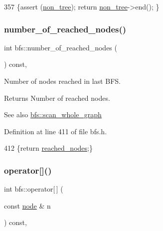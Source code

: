 \begin{DoxyCode}
357     \{assert (\mbox{\hyperlink{classbfs_a056b2131db11e62eb8f41c8dcc117d2e}{non\_tree}}); \textcolor{keywordflow}{return} \mbox{\hyperlink{classbfs_a056b2131db11e62eb8f41c8dcc117d2e}{non\_tree}}->end(); \}
\end{DoxyCode}
\mbox{\label{classbfs_abb971551139ed87e6c78062275301c1b}} 
\subsubsection{\texorpdfstring{number\+\_\+of\+\_\+reached\+\_\+nodes()}{number\_of\_reached\_nodes()}}
{\footnotesize\ttfamily int bfs\+::number\+\_\+of\+\_\+reached\+\_\+nodes (\begin{DoxyParamCaption}{ }\end{DoxyParamCaption}) const\hspace{0.3cm}{\ttfamily [inline]}, {\ttfamily [inherited]}}



Number of nodes reached in last B\+FS. 

\begin{DoxyReturn}{Returns}
Number of reached nodes. 
\end{DoxyReturn}
\begin{DoxySeeAlso}{See also}
\mbox{\hyperlink{classbfs_a25fc51b1bfbbdd3afefe0a84c1bd2f6b}{bfs\+::scan\+\_\+whole\+\_\+graph}} 
\end{DoxySeeAlso}


Definition at line 411 of file bfs.\+h.


\begin{DoxyCode}
412     \{\textcolor{keywordflow}{return} \mbox{\hyperlink{classbfs_ac3db80b59d5db049199936445a6c2da8}{reached\_nodes}};\}
\end{DoxyCode}
\mbox{\label{classbfs_addc2a3d0a275007455d22f6b76830e66}} 
\subsubsection{\texorpdfstring{operator[]()}{operator[]()}}
{\footnotesize\ttfamily int bfs\+::operator\mbox{[}$\,$\mbox{]} (\begin{DoxyParamCaption}\item[{const \mbox{\hyperlink{classnode}{node}} \&}]{n }\end{DoxyParamCaption}) const\hspace{0.3cm}{\ttfamily [inline]}, {\ttfamily [inherited]}}



